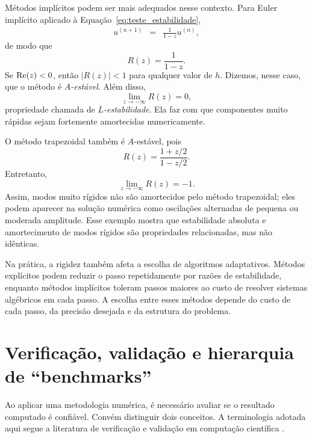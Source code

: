 Métodos implícitos podem ser mais adequados nesse contexto. Para Euler implícito aplicado à Equação~\eqref{eq:teste_estabilidade},
\begin{eqnarray}
u^{(n+1)}&=&\frac{1}{1-z}u^{(n)},
\end{eqnarray}
de modo que
\begin{equation}
R(z)=\frac{1}{1-z}.
\end{equation}
Se $\mathop{\rm Re}(z)<0$, então $|R(z)|<1$ para qualquer valor de $h$. Dizemos, nesse caso, que o método é \emph{$A$-estável}. Além disso,
\begin{equation}
\lim_{z\to-\infty}R(z)=0,
\end{equation}
propriedade chamada de \emph{$L$-estabilidade}. Ela faz com que componentes muito rápidas sejam fortemente amortecidas numericamente.

O método trapezoidal também é $A$-estável, pois
\begin{equation}
R(z)=\frac{1+z/2}{1-z/2}.
\end{equation}
Entretanto,
\begin{equation}
\lim_{z\to-\infty}R(z)=-1.
\end{equation}
Assim, modos muito rígidos não são amortecidos pelo método trapezoidal; eles podem aparecer na solução numérica como oscilações alternadas de pequena ou moderada amplitude. Esse exemplo mostra que estabilidade absoluta e amortecimento de modos rígidos são propriedades relacionadas, mas não idênticas.

Na prática, a rigidez também afeta a escolha de algoritmos adaptativos. Métodos explícitos podem reduzir o passo repetidamente por razões de estabilidade, enquanto métodos implícitos toleram passos maiores ao custo de resolver sistemas algébricos em cada passo. A escolha entre esses métodos depende do custo de cada passo, da precisão desejada e da estrutura do problema.

\section{Verificação, validação e hierarquia de ``benchmarks''}

Ao aplicar uma metodologia numérica, é necessário avaliar se o resultado computado é confiável. Convém distinguir dois conceitos. A terminologia adotada aqui segue a literatura de verificação e validação em computação científica \cite{AIAA1998VV,ASMEVV10,AIAA2024Code,OberkampfRoy2025}.

